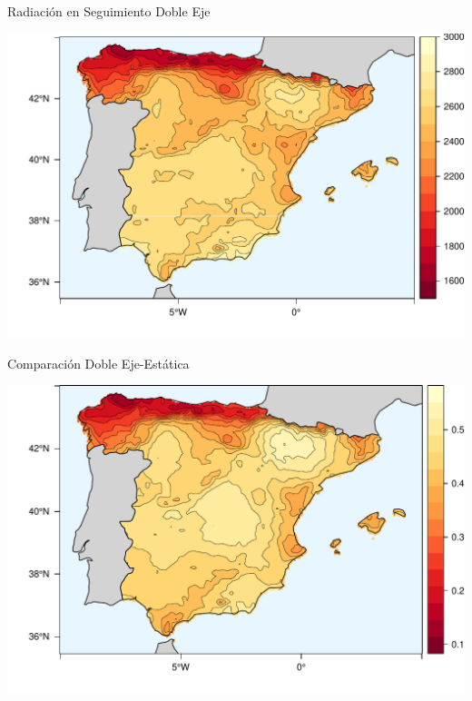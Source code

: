 \documentclass[xcolor={usenames,svgnames,dvipsnames}]{beamer}
\begin{document}
\begin{frame}[label={sec:orgd1ebce1}]{Radiación en Seguimiento Doble Eje}
\begin{center}
\includegraphics[width=.9\linewidth]{../figs/TwoKrig.pdf}
\end{center}
\end{frame}


\begin{frame}[label={sec:org2ca2e95}]{Comparación Doble Eje-Estática}
\begin{center}
\includegraphics[width=.9\linewidth]{../figs/TwoFixed.pdf}
\end{center}
\end{frame}
\end{document}
